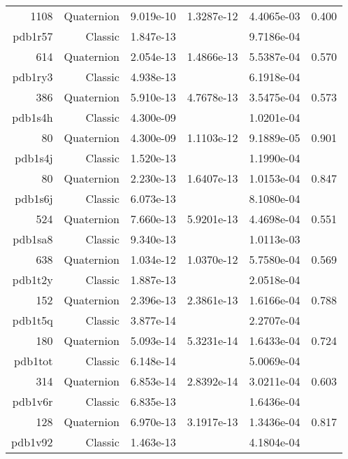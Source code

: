 \begin{xltabular}{\textwidth}{r|rS[table-format=1.3e+2]S[table-format=1.4e+2]S[table-format=1.4e+2]S[table-format=-1.3]}
1108 & Quaternion & 9.019e-10 & 1.3287e-12 & 4.4065e-03 & 0.400\\  \addlinespace
{\color{red} pdb1r57 } & Classic & 1.847e-13 &  & 9.7186e-04 & \\
614 & Quaternion & 2.054e-13 & 1.4866e-13 & 5.5387e-04 & 0.570\\  \addlinespace
{\color{red} pdb1ry3 } & Classic & 4.938e-13 &  & 6.1918e-04 & \\
386 & Quaternion & 5.910e-13 & 4.7678e-13 & 3.5475e-04 & 0.573\\  \addlinespace
{\color{red} pdb1s4h } & Classic & 4.300e-09 &  & 1.0201e-04 & \\
80 & Quaternion & 4.300e-09 & 1.1103e-12 & 9.1889e-05 & 0.901\\  \addlinespace
{\color{red} pdb1s4j } & Classic & 1.520e-13 &  & 1.1990e-04 & \\
80 & Quaternion & 2.230e-13 & 1.6407e-13 & 1.0153e-04 & 0.847\\  \addlinespace
{\color{red} pdb1s6j } & Classic & 6.073e-13 &  & 8.1080e-04 & \\
524 & Quaternion & 7.660e-13 & 5.9201e-13 & 4.4698e-04 & 0.551\\  \addlinespace
{\color{red} pdb1sa8 } & Classic & 9.340e-13 &  & 1.0113e-03 & \\
638 & Quaternion & 1.034e-12 & 1.0370e-12 & 5.7580e-04 & 0.569\\  \addlinespace
{\color{red} pdb1t2y } & Classic & 1.887e-13 &  & 2.0518e-04 & \\
152 & Quaternion & 2.396e-13 & 2.3861e-13 & 1.6166e-04 & 0.788\\  \addlinespace
{\color{red} pdb1t5q } & Classic & 3.877e-14 &  & 2.2707e-04 & \\
180 & Quaternion & 5.093e-14 & 5.3231e-14 & 1.6433e-04 & 0.724\\  \addlinespace
{\color{red} pdb1tot } & Classic & 6.148e-14 &  & 5.0069e-04 & \\
314 & Quaternion & 6.853e-14 & 2.8392e-14 & 3.0211e-04 & 0.603\\  \addlinespace
{\color{red} pdb1v6r } & Classic & 6.835e-13 &  & 1.6436e-04 & \\
128 & Quaternion & 6.970e-13 & 3.1917e-13 & 1.3436e-04 & 0.817\\  \addlinespace
{\color{red} pdb1v92 } & Classic & 1.463e-13 &  & 4.1804e-04 & \\

\end{xltabular}
